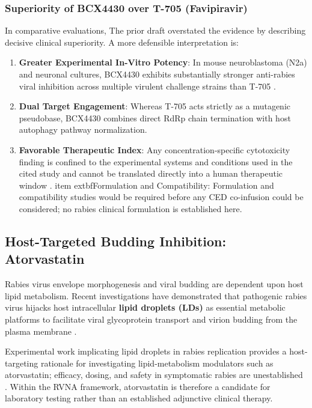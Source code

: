 \documentclass[12pt,a4paper]{article}
\begin{document}
\subsubsection{Superiority of BCX4430 over T-705 (Favipiravir)}
In comparative evaluations, The prior draft overstated the evidence by describing decisive clinical superiority. A more defensible interpretation is:
\begin{enumerate}
    \item \textbf{Greater Experimental In-Vitro Potency}: In mouse neuroblastoma (N2a) and neuronal cultures, BCX4430 exhibits substantially stronger anti-rabies viral inhibition across multiple virulent challenge strains than T-705 \citep{xie2023bcx}.
    \item \textbf{Dual Target Engagement}: Whereas T-705 acts strictly as a mutagenic pseudobase, BCX4430 combines direct RdRp chain termination with host autophagy pathway normalization.
    \item \textbf{Favorable Therapeutic Index}: Any concentration-specific cytotoxicity finding is confined to the experimental systems and conditions used in the cited study and cannot be translated directly into a human therapeutic window \citep{xie2023bcx}.
    item 	extbf{Formulation and Compatibility}: Formulation and compatibility studies would be required before any CED co-infusion could be considered; no rabies clinical formulation is established here.
\end{enumerate}

\subsection{Host-Targeted Budding Inhibition: Atorvastatin}

Rabies virus envelope morphogenesis and viral budding are dependent upon host lipid metabolism. Recent investigations have demonstrated that pathogenic rabies virus hijacks host intracellular \textbf{lipid droplets (LDs)} as essential metabolic platforms to facilitate viral glycoprotein transport and virion budding from the plasma membrane \citep{zhao2022ld}.

Experimental work implicating lipid droplets in rabies replication provides a host-targeting rationale for investigating lipid-metabolism modulators such as atorvastatin; efficacy, dosing, and safety in symptomatic rabies are unestablished \citep{zhao2022ld}. Within the RVNA framework, atorvastatin is therefore a candidate for laboratory testing rather than an established adjunctive clinical therapy.
\end{document}
